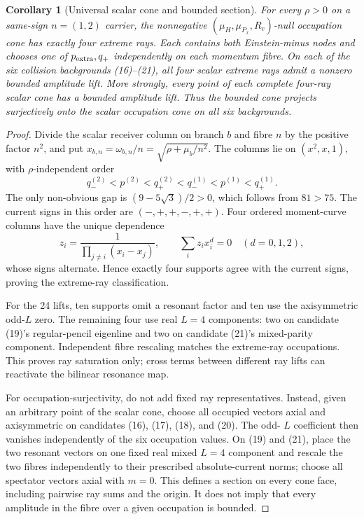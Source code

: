 \documentclass[11pt]{article}
\newtheorem{corollary}[theorem]{Corollary}
\theoremstyle{definition}
\theoremstyle{remark}
\begin{document}
\begin{corollary}[Universal scalar cone and bounded section]\label{cor:collision-rays}
For every \(\rho>0\) on a same-sign \(n=(1,2)\) carrier, the nonnegative
\((\mu_H,\mu_{P_x},R_c)\)-null occupation cone has exactly four extreme
rays.  Each contains both Einstein-minus nodes and chooses one of
\(p_{\rm extra},q_+\) independently on each momentum fibre.  On each of
the six collision backgrounds (16)--(21), all four scalar extreme rays admit
a nonzero bounded amplitude lift.  More strongly, every point of each complete
four-ray scalar cone has a bounded amplitude lift.  Thus the bounded cone
projects surjectively onto the scalar occupation cone on all six backgrounds.
\end{corollary}

\begin{proof}
Divide the scalar receiver column on branch \(b\) and fibre \(n\) by the
positive factor \(n^2\), and put
\(x_{b,n}=\omega_{b,n}/n=\sqrt{\rho+\mu_b/n^2}\).  The columns lie on
\((x^2,x,1)\), with \(\rho\)-independent order
\[
 q_-^{(2)}<p^{(2)}<q_+^{(2)}<q_-^{(1)}<p^{(1)}<q_+^{(1)}.
\]
The only non-obvious gap is
\((9-5\sqrt3)/2>0\), which follows from \(81>75\).  The current signs in
this order are \((-,+,+,-,+,+)\).  Four ordered moment-curve columns have
the unique dependence
\[
 z_i=\frac1{\prod_{j\ne i}(x_i-x_j)},
 \qquad \sum_i z_i x_i^d=0\quad(d=0,1,2),
\]
whose signs alternate.  Hence exactly four supports agree with the current
signs, proving the extreme-ray classification.

For the 24 lifts, ten supports omit a resonant factor and ten use the
axisymmetric odd-\(L\) zero.  The remaining four use real \(L=4\) components:
two on candidate (19)'s regular-pencil eigenline and two on candidate (21)'s
mixed-parity component.  Independent fibre rescaling matches the extreme-ray
occupations.  This proves ray saturation only; cross terms between different
ray lifts can reactivate the bilinear resonance map.

For occupation-surjectivity, do not add fixed ray representatives.  Instead,
given an arbitrary point of the scalar cone, choose all occupied vectors
axial and axisymmetric on candidates (16), (17), (18), and (20).  The odd-
\(L\) coefficient then vanishes independently of the six occupation values.
On (19) and (21), place the two resonant vectors on one fixed real mixed
\(L=4\) component and rescale the two fibres independently to their prescribed
absolute-current norms; choose all spectator vectors axial with \(m=0\).
This defines a section on every cone face, including pairwise ray sums and the
origin.  It does not imply that every amplitude in the fibre over a given
occupation is bounded.
\end{proof}
\end{document}
